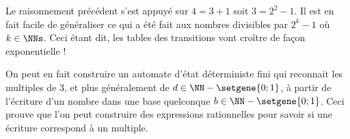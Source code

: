 Le raisonnement précédent s'est appuyé sur $4 = 3 + 1$ soit $3 = 2^2 - 1$. Il est en fait facile de généraliser ce qui a été fait aux nombres divisibles par $2^k - 1$ où $k \in \NNs$.
Ceci étant dit, les tables des transitions vont croître de façon exponentielle !


\medskip


On peut en fait construire un automate d'état déterministe fini qui reconnait les multiples de $3$, et plus généralement de $d \in \NN - \setgene{0 ; 1}$, à partir de l'écriture d'un nombre dans une base quelconque $b \in \NN - \setgene{0 ; 1}$.
Ceci prouve que l'on peut construire des expressions rationnelles pour savoir si une écriture correspond à un multiple.